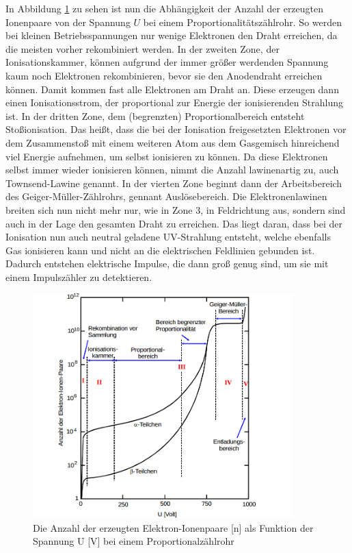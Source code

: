 \documentclass[
  bibliography=totoc,     %
  captions=tableheading,  %
  titlepage=firstiscover, %
]{scrartcl}
\begin{document}
In Abbildung \ref{fig:V7032} zu sehen ist nun die Abhängigkeit der Anzahl der
erzeugten Ionenpaare von der Spannung $U$ bei einem Proportionalitätszählrohr.
So werden bei kleinen Betriebsspannungen nur wenige Elektronen den Draht
erreichen, da die meisten vorher rekombiniert werden. In der zweiten Zone, der
Ionisationskammer, können aufgrund der immer größer werdenden Spannung kaum noch
Elektronen rekombinieren, bevor sie den Anodendraht erreichen können. Damit
kommen fast alle Elektronen am Draht an. Diese erzeugen dann einen
Ionisationsstrom, der proportional zur Energie der ionisierenden Strahlung ist.
In der dritten Zone, dem (begrenzten) Proportionalbereich entsteht Stoßionisation.
Das heißt, dass die bei der Ionisation freigesetzten Elektronen vor dem Zusammenstoß
mit einem weiteren Atom aus dem Gasgemisch hinreichend viel Energie aufnehmen, um
selbst ionisieren zu können. Da diese Elektronen selbst immer wieder ionisieren
können, nimmt die Anzahl lawinenartig zu, auch Townsend-Lawine genannt.
In der vierten Zone beginnt dann der Arbeitsbereich des Geiger-Müller-Zählrohrs,
gennant Auslösebereich. Die Elektronenlawinen breiten sich nun nicht mehr nur,
wie in Zone 3, in Feldrichtung aus, sondern sind auch in der Lage den gesamten Draht
zu erreichen. Das liegt daran, dass bei der Ionisation nun auch neutral geladene
UV-Strahlung entsteht, welche ebenfalls Gas ionisieren kann und nicht an die elektrischen
Feldlinien gebunden ist. Dadurch entstehen elektrische Impulse, die dann groß genug
sind, um sie mit einem Impulszähler zu detektieren.
\begin{figure}[htb]
  \centering
  \includegraphics[width=0.9\textwidth]{V7032.png}
  \caption{Die Anzahl der erzeugten Elektron-Ionenpaare [n] als Funktion der
  Spannung U [V] bei einem Proportionalzählrohr}
  \label{fig:V7032}
\end{figure}
\end{document}
